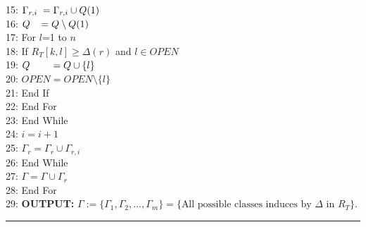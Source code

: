 \documentclass[11pt, oneside]{Thesis} %
\begin{document}
15: \hspace{1.9cm}$\Gamma_{r,i} \hspace{0.1cm} = \Gamma_{r,i} \cup Q(1)$\\
16: \hspace{1.9cm}$Q \hspace{0.3cm} = Q \setminus Q(1)$\\
17: \hspace{1.9cm}For $l$=1 to $n$\\
18: \hspace{2.4cm}If $R_T\left[k,l\right] \geq \Delta(r)$ and $l \in OPEN$\\
19: \hspace{2.9cm}$Q \hspace{0.74cm} = Q \cup \lbrace l \rbrace $\\
20: \hspace{2.9cm}$OPEN =  OPEN \setminus \lbrace l \rbrace$\\
21: \hspace{2.4cm}End If\\
22: \hspace{1.9cm}End For\\
23: \hspace{1.4cm}End While\\
24: \hspace{1.4cm}$i = i + 1$\\
25: \hspace{1.4cm}$\Gamma_r = \Gamma_r \cup \Gamma_{r,i}$\\
26: \hspace{0.8cm}End While\\
27: \hspace{0.8cm}$\Gamma = \Gamma \cup \Gamma_r$\\
28: \hspace{0.3cm}End For\\
29: \hspace{0.25cm}\textbf{OUTPUT:} $\Gamma := \lbrace \Gamma_1, \Gamma_2, ..., \Gamma_m \rbrace = \lbrace
\text{All possible classes induces by $\Delta$ in $R_T$} \rbrace$. \\
\noindent\rule[0.1cm]{\linewidth}{0.3pt}

\newpage
\end{document}
